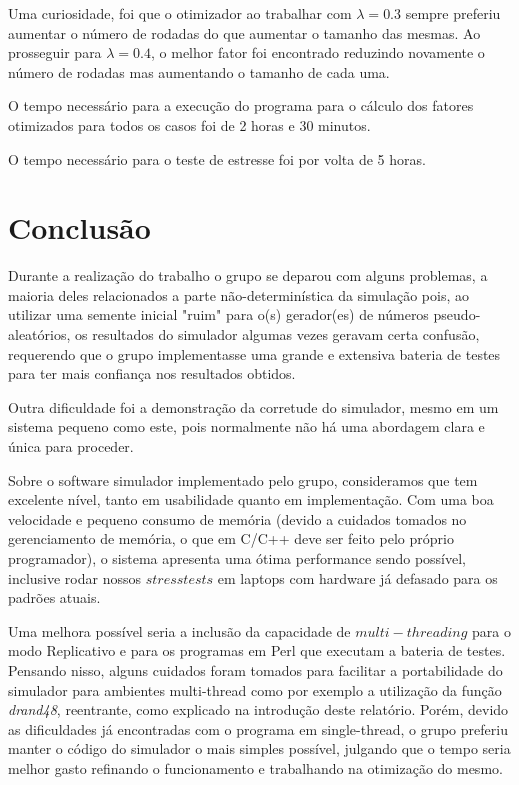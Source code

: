 \documentclass[a4paper,10pt]{article}
\begin{document}
Uma curiosidade, foi que o otimizador ao trabalhar com $\lambda = 0.3$ sempre preferiu aumentar o número de rodadas do que aumentar o tamanho das mesmas. Ao prosseguir para $\lambda = 0.4$, o melhor fator foi encontrado reduzindo novamente o número de rodadas mas aumentando o tamanho de cada uma.

O tempo necessário para a execução do programa para o cálculo dos fatores otimizados para todos os casos foi de 2 horas e 30 minutos.

O tempo necessário para o teste de estresse foi por volta de 5 horas.

\pagebreak

\section{Conclusão}

    Durante a realização do trabalho o grupo se deparou com alguns problemas, a maioria deles relacionados a parte não-determinística da simulação pois, ao utilizar uma semente inicial "ruim" para o(s) gerador(es) de números pseudo-aleatórios, os resultados do simulador algumas vezes geravam certa confusão, requerendo que o grupo implementasse uma grande e extensiva bateria de testes para ter mais confiança nos resultados obtidos.

Outra dificuldade foi a demonstração da corretude do simulador, mesmo em um sistema pequeno como este, pois normalmente não há uma abordagem clara e única para proceder.

    Sobre o software simulador implementado pelo grupo, consideramos que tem excelente nível, tanto em usabilidade quanto em implementação. Com uma boa velocidade e pequeno consumo de memória (devido a cuidados tomados no gerenciamento de memória, o que em C/C++ deve ser feito pelo próprio programador), o sistema apresenta uma ótima performance sendo possível, inclusive rodar nossos $stress tests$ em laptops com hardware já defasado para os padrões atuais.


    Uma melhora possível seria a inclusão da capacidade de $multi-threading$ para o modo Replicativo e para os programas em Perl que executam a bateria de testes. Pensando nisso, alguns cuidados foram tomados para facilitar a portabilidade do simulador para ambientes multi-thread como por exemplo a utilização da função \emph{drand48}, reentrante, como explicado na introdução deste relatório. Porém, devido as dificuldades já encontradas com o programa em single-thread, o grupo preferiu manter o código do simulador o mais simples possível, julgando que o tempo seria melhor gasto refinando o funcionamento e trabalhando na otimização do mesmo.
\end{document}
